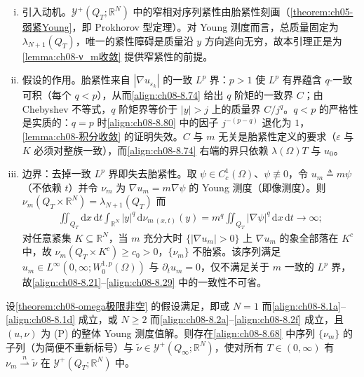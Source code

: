 \documentclass[../../main.tex]{subfiles}%
\begin{document}
\begin{remark}\label{remark:ch08-紧性}
\begin{enumerate}[(i)]
\item 引入动机。$\mathcal{Y}^+(Q_T;\mathbb{R}^N)$ 中的窄相对序列紧性由胎紧性刻画（\cref{theorem:ch05-弱紧Young}，即 Prokhorov 型定理）。对 Young 测度而言，总质量固定为 $\lambda_{N+1}(Q_T)$，唯一的紧性障碍是质量沿 $y$ 方向逃向无穷，故本引理正是为\cref{lemma:ch08-ν_m收敛} 提供窄紧性的前提。
\item 假设的作用。胎紧性来自 $|\nabla u_{\varepsilon_k}|$ 的一致 $L^p$ 界：$p>1$ 使 $L^p$ 有界蕴含 $q$-一致可积（每个 $q<p$），从而\eqref{align:ch08-8.74} 给出 $q$ 阶矩的一致界 $C$；由 Chebyshev 不等式，$q$ 阶矩界等价于 $|y|>j$ 上的质量界 $C/j^q$。$q<p$ 的严格性是实质的：$q=p$ 时\eqref{align:ch08-8.80} 中的因子 $j^{-(p-q)}$ 退化为 $1$，\cref{lemma:ch08-积分收敛} 的证明失效。$C$ 与 $m$ 无关是胎紧性定义的要求（$\varepsilon$ 与 $K$ 必须对整族一致），而\eqref{align:ch08-8.74} 右端的界只依赖 $\lambda(\Omega)T$ 与 $u_0$。
\item 边界：去掉一致 $L^p$ 界即失去胎紧性。取 $\psi\in C^1_c(\Omega)$、$\psi\not\equiv0$，令 $u_m\triangleq m\psi$（不依赖 $t$）并令 $\nu_m$ 为 $\nabla u_m=m\nabla\psi$ 的 Young 测度（即像测度）。则 $\nu_m(Q_T\times\mathbb{R}^N)=\lambda_{N+1}(Q_T)$ 而
\begin{align*}
\iint_{Q_T}\mathrm{d}x\,\mathrm{d}t\int_{\mathbb{R}^N}|y|^q\,\mathrm{d}\nu_{m\,(x,t)}(y)
=m^q\iint_{Q_T}|\nabla\psi|^q\,\mathrm{d}x\,\mathrm{d}t\to\infty;
\end{align*}
对任意紧集 $K\subseteq\mathbb{R}^N$，当 $m$ 充分大时 $\{|\nabla u_m|>0\}$ 上 $\nabla u_m$ 的象全部落在 $K^c$ 中，故 $\nu_m(Q_T\times K^c)\geqslant c_0>0$，$\{\nu_m\}$ 不胎紧。该序列满足 $u_m\in L^\infty(0,\infty;W^{1,p}_0(\Omega))$ 与 $\partial_t u_m=0$，仅不满足关于 $m$ 一致的 $L^p$ 界，故\eqref{align:ch08-8.21}--\eqref{align:ch08-8.29} 中的一致性不可省。
\end{enumerate}
\end{remark}

\begin{lemma}\label{lemma:ch08-ν_m收敛}
设\cref{theorem:ch08-omega极限非空} 的假设满足，即或 $N=1$ 而\eqref{align:ch08-8.1a}--\eqref{align:ch08-8.1d} 成立，或 $N\geqslant2$ 而\eqref{align:ch08-8.2a}--\eqref{align:ch08-8.2f} 成立，且 $(u,\nu)$ 为 (P) 的整体 Young 测度值解。则存在\eqref{align:ch08-8.68} 中序列 $\{\nu_m\}$ 的子列（为简便不重新标号）与 $\tilde\nu\in\mathcal{Y}^+(Q_\infty;\mathbb{R}^N)$，使对所有 $T\in(0,\infty)$ 有 $\nu_m\stackrel{n}{\rightharpoonup}\tilde\nu$ 在 $\mathcal{Y}^+(Q_T;\mathbb{R}^N)$ 中。
\end{lemma}
\end{document}
